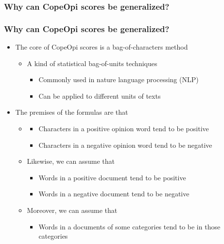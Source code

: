 \documentclass[mathserif]{beamer}
\begin{document}
\subsubsection{Why can CopeOpi scores be generalized?}
\begin{frame}
\frametitle{Why can CopeOpi scores be generalized?}
\begin{itemize}
\item The core of CopeOpi scores is a bag-of-characters method
	\begin{itemize}
	\item A kind of statistical bag-of-units techniques
		\begin{itemize}
		\item Commonly used in nature language processing (NLP)
		\item Can be applied to different units of texts
		\end{itemize}
	\end{itemize}
\item The premises of the formulas are that
	\begin{itemize}
	\item[]
		\begin{itemize}
		\item Characters in a positive opinion word tend to be positive
		\item Characters in a negative opinion word tend to be negative
		\end{itemize}
	\item Likewise, we can assume that
		\begin{itemize}
		\item Words in a positive document tend to be positive
		\item Words in a negative document tend to be negative
		\end{itemize}
	\item Moreover, we can assume that
		\begin{itemize}
		\item Words in a documents of some categories tend to be in those categories 
		\end{itemize}
	\end{itemize}
\end{itemize}
\end{frame}
\end{document}
